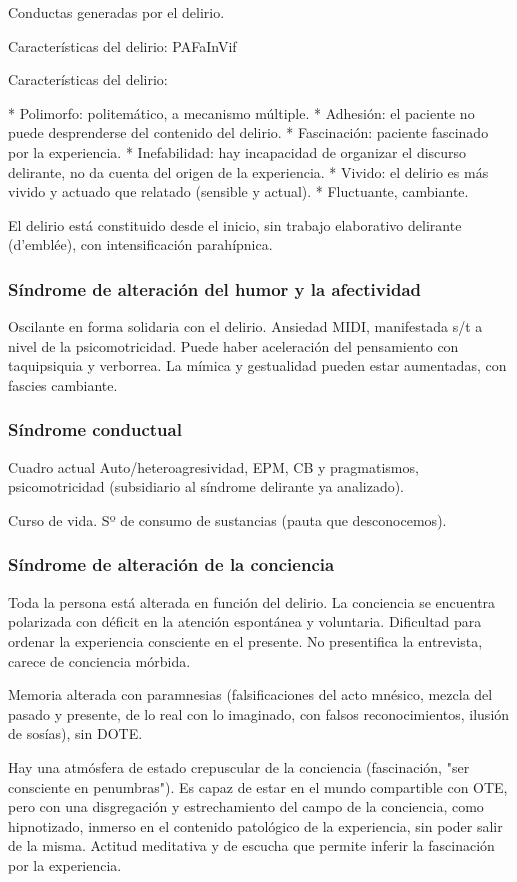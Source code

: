 \documentclass{scrbook}
\begin{document}
Conductas generadas por el delirio.

\faLightbulb Características del delirio: PAFaInVif

Características del delirio:

* Polimorfo: politemático, a mecanismo múltiple.
* Adhesión: el paciente no puede desprenderse del contenido del delirio.
* Fascinación: paciente fascinado por la experiencia.
* Inefabilidad: hay incapacidad de organizar el discurso delirante, no da cuenta del origen de la experiencia.
* Vivido: el delirio es más vivido y actuado que relatado (sensible y actual).
* Fluctuante, cambiante.

El delirio está constituido desde el inicio, sin trabajo elaborativo delirante (d'emblée), con intensificación parahípnica.

\subsubsection*{Síndrome de alteración del humor y la afectividad}
Oscilante en forma solidaria con el delirio. Ansiedad MIDI, manifestada s/t a nivel de la psicomotricidad. Puede haber aceleración del pensamiento con taquipsiquia y verborrea. La mímica y gestualidad pueden estar aumentadas, con fascies cambiante.
\subsubsection*{Síndrome conductual}
Cuadro actual Auto/heteroagresividad, EPM, CB y pragmatismos, psicomotricidad (subsidiario al síndrome delirante ya analizado).

Curso de vida. Sº de consumo de sustancias (pauta que desconocemos).
\subsubsection*{Síndrome de alteración de la conciencia}
Toda la persona está alterada en función del delirio. La conciencia se encuentra polarizada con déficit en la atención espontánea y voluntaria. Dificultad para ordenar la experiencia consciente en el presente. No presentifica la entrevista, carece de conciencia mórbida.

Memoria alterada con paramnesias (falsificaciones del acto mnésico, mezcla del pasado y presente, de lo real con lo imaginado, con falsos reconocimientos, ilusión de sosías), sin DOTE.

Hay una atmósfera de estado crepuscular de la conciencia (fascinación, "ser consciente en penumbras"). Es capaz de estar en el mundo compartible con OTE, pero con una disgregación y estrechamiento del campo de la conciencia, como hipnotizado, inmerso en el contenido patológico de la experiencia, sin poder salir de la misma. Actitud meditativa y de escucha que permite inferir la fascinación por la experiencia.
\end{document}
